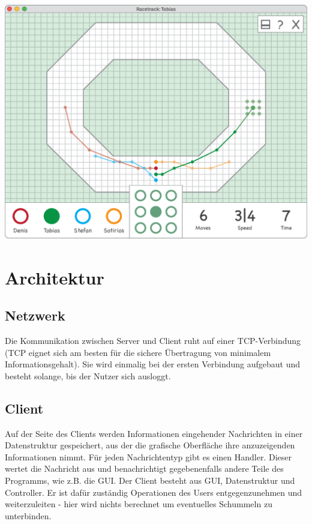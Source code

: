 \documentclass[a0, portrait, english, ngerman]{a0poster}
\begin{document}
\begin{multicols}{3}
\vspace{0.5cm}
\centering \includegraphics[scale=0.85]{images/GamePlay.eps} \\

\section{Architektur}
	\subsection{Netzwerk}
    
Die Kommunikation zwischen Server und Client ruht auf einer TCP-Verbindung (TCP eignet sich am besten für die sichere Übertragung von minimalem Informationsgehalt). Sie wird einmalig bei der ersten Verbindung aufgebaut und besteht solange, bis der Nutzer sich ausloggt.\\

\subsection{Client}

Auf der Seite des Clients werden Informationen eingehender Nachrichten in einer Datenstruktur gespeichert, aus der die grafische Oberfläche ihre anzuzeigenden Informationen nimmt. Für jeden Nachrichtentyp gibt es einen Handler. Dieser wertet die Nachricht aus und benachrichtigt gegebenenfalls andere Teile des Programms, wie z.B. die GUI. Der Client besteht aus GUI, Datenstruktur und Controller. Er ist dafür zuständig Operationen des Users entgegenzunehmen und weiterzuleiten - hier wird nichts berechnet um eventuelles Schummeln zu unterbinden.\\


\end{multicols}
\end{document}
